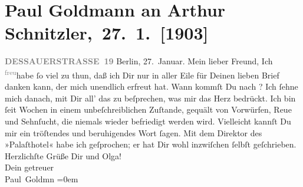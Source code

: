 

         
         \renewcommand{\erwaehntePersonen}{Personen: Paul Goldmann, Eduard Gutscher, Olga Schnitzler}
         \renewcommand{\erwaehnteInstitutionen}{Institutionen: Palasthotel Berlin}
         \renewcommand{\erwaehnteOrte}{Orte: Berlin, Dessauer Straße, Palasthotel Berlin, Wien}
         \renewcommand{\erwaehnteWerke}{}
               \section[ Paul Goldmann an Arthur Schnitzler, 27. 1. {[}1903{]}]{ Paul Goldmann an Arthur Schnitzler, 27. 1. {[}1903{]}}\nopagebreak{}\rehead{ }\begin{ledgroupsized}[t]{13cm}\normalsize\beginnumbering \toendnotes[C]{\smallbreak\pagebreak[2]} 
\toendnotes[C]{\smallbreak}\pstart
           \noindent{}\raggedleft{}{\pb}\textcolor{gray}{\textbf{DESSAUERSTRASSE 19}}\pend
           \pstart
           Berlin, 27. Januar.\pend
           \pstart\center{}Mein lieber Freund,\pend\pstart
           Ich \substVorne{}\textsuperscript{\textcolor{gray}{freu}}\substDazwischen{}habe\substHinten{} ſo viel zu thun, daß ich Dir nur in aller Eile für Deinen lieben Brief
               danken kann, der mich unendlich erfreut hat. Wann kommſt Du nach \label{K_L03361-1v}\label{K_L03361-1h}? Ich ſehne mich danach, mit
               Dir all’ das zu beſprechen, was mir das Herz bedrückt. Ich bin ſeit Wochen in einem
               unbeſchreiblichen Zuſtande, gequält von Vorwürfen, Reue und Sehnſucht, die niemals
                  {\pb}wieder befriedigt werden wird. Vielleicht kannſt
               Du mir ein tröſtendes und beruhigendes Wort ſagen. Mit dem Direktor des »Palaſthotel« habe ich geſprochen; er hat Dir wohl inzwiſchen
               ſelbſt geſchrieben.\pend
           \pstart
           Herzlichſte Grüße Dir und Olga! {\\[\baselineskip]}Dein
               getreuer {\\[\baselineskip]}\spacefill\mbox{Paul Goldmn}\pend
           \leftskip=0em{}
         

\end{ledgroupsized}
